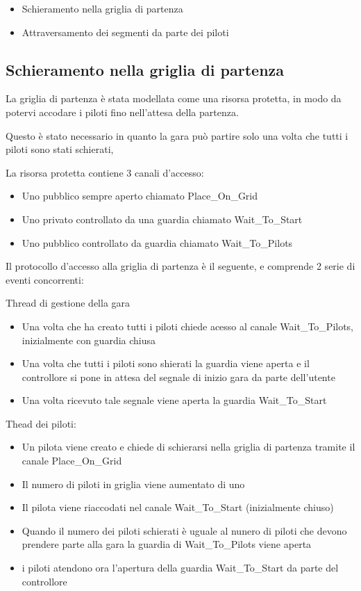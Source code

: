 \documentclass[a4paper,11pt, twoside]{book}
\begin{document}
      \begin{itemize}
        \item Schieramento nella griglia di partenza
	\item Attraversamento dei segmenti da parte dei piloti
      \end{itemize}
      
      \subsection{Schieramento nella griglia di partenza}
        La griglia di partenza è stata modellata come una risorsa protetta, in modo da potervi accodare i piloti
	fino nell'attesa della partenza.
	
	Questo è stato necessario in quanto la gara può partire solo una volta che tutti i piloti sono stati schierati,
	
	La risorsa protetta contiene 3 canali d'accesso:
	\begin{itemize}
	  \item Uno pubblico sempre aperto chiamato Place\_On\_Grid
	  \item Uno privato controllato da una guardia chiamato  Wait\_To\_Start
	  \item Uno pubblico controllato da guardia chiamato Wait\_To\_Pilots
	\end{itemize}
	
	Il protocollo d'accesso alla griglia di partenza è il seguente, e comprende 2 serie di eventi
	concorrenti:
	
	Thread di gestione della gara
	\begin{itemize}
	  \item Una volta che ha creato tutti i piloti chiede acesso al canale Wait\_To\_Pilots,
	        inizialmente con guardia chiusa
          \item Una volta che tutti i piloti sono shierati la guardia viene aperta e il controllore
	        si pone in attesa del segnale di inizio gara da parte dell'utente
	  \item Una volta ricevuto tale segnale viene aperta la guardia Wait\_To\_Start
	\end{itemize}
	
	Thead dei piloti:
	\begin{itemize}
	  \item Un pilota viene creato e chiede di schierarsi nella griglia di partenza tramite il canale Place\_On\_Grid
	  \item Il numero di piloti in griglia viene aumentato di uno
	  \item Il pilota viene riaccodati nel canale Wait\_To\_Start (inizialmente chiuso)
	  
	  \item Quando il numero dei piloti schierati è uguale al nunero di piloti che devono prendere parte alla gara
	        la guardia di Wait\_To\_Pilots viene aperta
          \item i piloti atendono ora l'apertura della guardia Wait\_To\_Start da parte del controllore
	\end{itemize}
\end{document}
